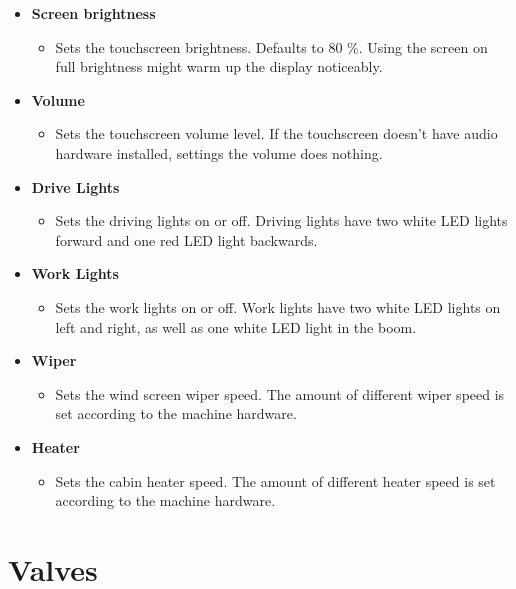 \documentclass[12pt,a4paper,english]{uvmanual}
\begin{document}
\begin{itemize}
 \item \textbf{Screen brightness}
 \begin{itemize}
  \item Sets the touchscreen brightness. Defaults to 80 \%. Using the screen on full brightness might warm up the display noticeably.
 \end{itemize}

 \item \textbf{Volume}
 \begin{itemize}
  \item Sets the touchscreen volume level. If the touchscreen doesn't have audio hardware installed, settings the volume does nothing.
 \end{itemize}

 \item \textbf{Drive Lights}
 \begin{itemize}
  \item Sets the driving lights on or off. Driving lights have two white LED lights forward and one red LED light backwards.
 \end{itemize}

 \item \textbf{Work Lights}
 \begin{itemize}
  \item Sets the work lights on or off. Work lights have two white LED lights on left and right, as well as one white LED light in the boom.
 \end{itemize}

 \item \textbf{Wiper}
 \begin{itemize}
  \item Sets the wind screen wiper speed. The amount of different wiper speed is set according to the machine hardware.
 \end{itemize}

 \item \textbf{Heater}
 \begin{itemize}
  \item Sets the cabin heater speed. The amount of different heater speed is set according to the machine hardware.
 \end{itemize}

\end{itemize}


\section{Valves}\label{ch:settings_valves}
\end{document}

